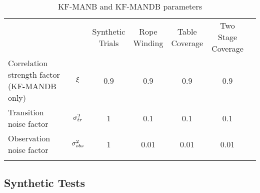 \begin{table}[h]
\centering
\caption{KF-MANB and KF-MANDB parameters}
\label{tab:param_table}
\begin{tabular}{lcccccc}
\hline\noalign{\smallskip}
                                                            &                               & \makecell{Synthetic\\Trials} 
                                                                                            & \makecell{Rope\\Winding}
                                                                                            & \makecell{Table\\Coverage}
                                                                                            & \makecell{Two Stage\\Coverage} \\
\noalign{\smallskip}\hline\noalign{\smallskip}
\makecell[l]{Correlation strength factor\\(KF-MANDB only)}  & $\xi$          &  0.9 &   0.9 &   0.9 &   0.9 \\
\noalign{\smallskip}
Transition noise factor                                     & $\sigma_{tr}^2$    &    1 &   0.1 &   0.1 &   0.1 \\
\noalign{\smallskip}
Observation noise factor                                    & $\sigma_{obs}^2$   &    1 &  0.01 &  0.01 &  0.01 \\
\noalign{\smallskip}\hline
\end{tabular}
\end{table}


\subsection{Synthetic Tests}
\label{sec:synthetic_trials}

